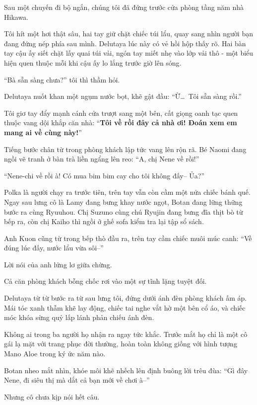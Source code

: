 \documentclass[../main.tex]{subfiles}
\begin{document}
\ct

Sau một chuyến đi bộ ngắn, chúng tôi đã đứng trước cửa phòng tầng năm nhà Hikawa.

Tôi hít một hơi thật sâu, hai tay giữ chặt chiếc túi lẩu, quay sang nhìn người bạn đang đứng nép phía sau mình. Delutaya lúc này có vẻ hồi hộp thấy rõ. Hai bàn tay cậu ấy siết chặt lấy quai túi vải, ngón tay miết nhẹ vào lớp vải thô - một biểu hiện quen thuộc mỗi khi cậu ấy lo lắng trước giờ lên sóng.

``Bà sẵn sàng chưa?'' tôi thì thầm hỏi.

Delutaya nuốt khan một ngụm nước bọt, khẽ gật đầu: ``Ừ\dots\ Tôi sẵn sàng rồi.''

Tôi giơ tay đẩy mạnh cánh cửa trượt sang một bên, cất giọng oanh tạc quen thuộc vang dội khắp căn nhà: ``\textbf{Tôi về rồi đây cả nhà ơi! Đoán xem em mang ai về cùng này!}''

Tiếng bước chân từ trong phòng khách lập tức vang lên rộn rã. Bé Naomi đang ngồi vẽ tranh ở bàn trà liền ngẩng lên reo: ``A, chị Nene về rồi!''

``Nene-chi về rồi à! Có mua bim bim cay cho tôi không đấy-- Ủa?''

Polka là người chạy ra trước tiên, trên tay vẫn còn cầm một nửa chiếc bánh quế. Ngay sau lưng cô là Lamy đang bưng khay nước ngọt, Botan đang lững thững bước ra cùng Ryuuhou. Chị Suzuno cùng chú Ryujin đang bưng đĩa thịt bò từ bếp ra, còn chị Kaiho thì ngồi ở ghế sofa kiểm tra lại tập sổ sách.

Anh Kuon cũng từ trong bếp thò đầu ra, trên tay cầm chiếc muôi múc canh: ``Về đúng lúc đấy, nước lẩu vừa sôi--''

Lời nói của anh lửng lơ giữa chừng.

Cả căn phòng khách bỗng chốc rơi vào một sự tĩnh lặng tuyệt đối.

Delutaya từ từ bước ra từ sau lưng tôi, đứng dưới ánh đèn phòng khách ấm áp. Mái tóc xanh thẫm khẽ lay động, chiếc tai nghe vắt hờ một bên cổ áo, và chiếc móc khóa sừng quỷ lấp lánh phản chiếu ánh đèn.

Không ai trong ba người họ nhận ra ngay tức khắc. Trước mắt họ chỉ là một cô gái lạ mặt với trang phục đời thường, hoàn toàn không giống với hình tượng Mano Aloe trong ký ức năm nào.

Botan nheo mắt nhìn, khóe môi khẽ nhếch lên định buông lời trêu đùa: ``Gì đây Nene, đi siêu thị mà dắt cả bạn mới về chơi à--''

Nhưng cô chưa kịp nói hết câu.
\end{document}
